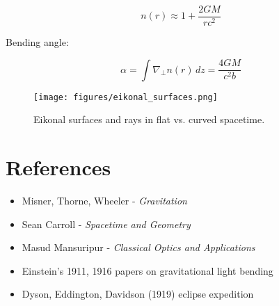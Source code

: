 \documentclass[11pt]{article}
\begin{document}
\begin{equation}
n(r) \approx 1 + \frac{2GM}{rc^2}
\end{equation}

Bending angle:

\begin{equation}
\alpha = \int \nabla_{\perp} n(r) \, dz = \frac{4GM}{c^2 b}
\end{equation}

\begin{figure}[h]
    \centering
    \texttt{[image: figures/eikonal\_surfaces.png]}
    \caption{Eikonal surfaces and rays in flat vs. curved spacetime.}
\end{figure}

\newpage
\section{References}
\begin{itemize}
    \item Misner, Thorne, Wheeler - \textit{Gravitation}
    \item Sean Carroll - \textit{Spacetime and Geometry}
    \item Masud Mansuripur - \textit{Classical Optics and Applications}
    \item Einstein's 1911, 1916 papers on gravitational light bending
    \item Dyson, Eddington, Davidson (1919) eclipse expedition
\end{itemize}
\end{document}
